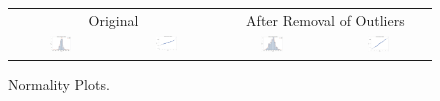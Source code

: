 \documentclass[11pt]{scrartcl} %
\begin{document}
\begin{figure}[H] %
	\centering
	\begin{tabular}{p{} p{}p{}p{}}
\hline	
	\multicolumn{2}{|c|}{Original} &  \multicolumn{2}{|c|}{After Removal of Outliers} \\
		\multicolumn{1}{|c}{\includegraphics[width=0.23\textwidth]{../graphics/A1Norm1}} &
		\multicolumn{1}{c|}{\includegraphics[width=0.23\textwidth]{../graphics/A1qq1}} &
		\multicolumn{1}{|c}{\includegraphics[width=0.23\textwidth]{../graphics/A1Norm2}} &
		\multicolumn{1}{c|}{\includegraphics[width=0.23\textwidth]{../graphics/A1qq2}}\\
		\hline
	\end{tabular}		
	\caption{Normality Plots.}
	\label{fig:A1QQ}
\end{figure}
\end{document}
